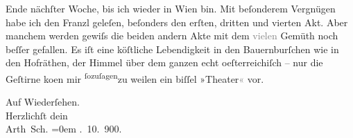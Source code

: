                Ende nächſter Woche, bis ich wieder {\pb}in Wien bin. Mit beſonderem Vergnügen habe ich den Franzl geleſen, beſonders den erſten, dritten und
               vierten Akt. Aber manchem werden gewiſs die beiden andern Akte mit dem
                  \textcolor{gray}{vielen} Gemüth noch beſſer gefallen. Es iſt eine köſtliche
               Lebendigkeit in den Bauernburſchen wie in den Hofräthen, {\pb}der Himmel über dem
               ganzen echt oeſterreichiſch – nur die Geſtirne
                  ko{\geminationm}en mir \substVorne{}\textsuperscript{ſozuſagen}\substDazwischen{}zu weilen\substHinten{} ein biſſel »Theater\textcolor{gray}{«} vor.\pend
           
\pstart
           Auf Wiederſehen.{\\[\baselineskip]}Herzlichſt dein{\\[\baselineskip]}\spacefill\mbox{Arth Sch.}\pend
           \leftskip=0em{}
. 10. 900.\pend
           \endnumbering{}  \newcommand{\dateiname}{L01078}\newcommand{\titel}{Arthur Schnitzler an Hermann Bahr, 18. 10. 1900}\newcommand{\editorInnen}{Herausgegeben von Martin Anton Müller}
